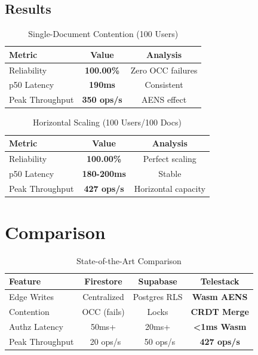 \documentclass[conference]{IEEEtran}
\begin{document}
\subsection{Results}
\begin{table}[h]
\caption{Single-Document Contention (100 Users)}
\begin{center}
\begin{tabular}{|l|c|c|}
\hline
\textbf{Metric} & \textbf{Value} & \textbf{Analysis} \\
\hline
Reliability & \textbf{100.00\%} & Zero OCC failures \\
p50 Latency & \textbf{190ms} & Consistent \\
Peak Throughput & \textbf{350 ops/s} & AENS effect \\
\hline
\end{tabular}
\end{center}
\label{tab:single}
\end{table}

\begin{table}[h]
\caption{Horizontal Scaling (100 Users/100 Docs)}
\begin{center}
\begin{tabular}{|l|c|c|}
\hline
\textbf{Metric} & \textbf{Value} & \textbf{Analysis} \\
\hline
Reliability & \textbf{100.00\%} & Perfect scaling \\
p50 Latency & \textbf{180-200ms} & Stable \\
Peak Throughput & \textbf{427 ops/s} & Horizontal capacity \\
\hline
\end{tabular}
\end{center}
\label{tab:horizontal}
\end{table}

\section{Comparison}
\begin{table}[h]
\caption{State-of-the-Art Comparison}
\begin{center}
\begin{tabular}{|l|c|c|c|}
\hline
\textbf{Feature} & \textbf{Firestore} & \textbf{Supabase} & \textbf{Telestack} \\
\hline
Edge Writes & Centralized & Postgres RLS & \textbf{Wasm AENS} \\
Contention & OCC (fails) & Locks & \textbf{CRDT Merge} \\
Authz Latency & 50ms+ & 20ms+ & \textbf{<1ms Wasm} \\
Peak Throughput & ~20 ops/s & ~50 ops/s & \textbf{427 ops/s} \\
\hline
\end{tabular}
\end{center}
\label{tab:comparison}
\end{table}
\end{document}
